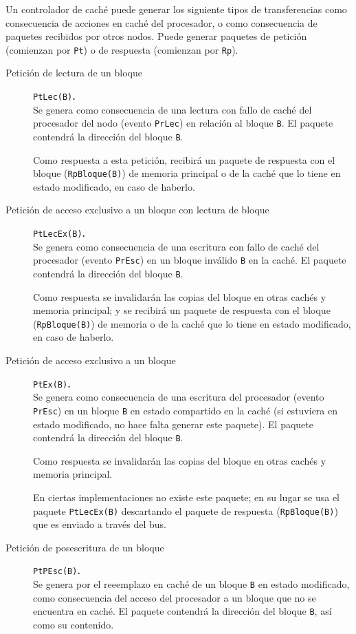 Un controlador de caché puede generar los siguiente tipos de transferencias como consecuencia de acciones en caché del procesador, o como consecuencia de paquetes recibidos por otros nodos. Puede generar paquetes de petición (comienzan por \verb|Pt|) o de respuesta (comienzan por \verb|Rp|).
\begin{description}
    \item [Petición de lectura de un bloque] \verb|PtLec(B)|\textbf{.}~\\
        Se genera como consecuencia de una lectura con fallo de caché del procesador del nodo (evento \verb|PrLec|) en relación al bloque \verb|B|. El paquete contendrá la dirección del bloque \verb|B|.

        Como respuesta a esta petición, recibirá un paquete de respuesta con el bloque (\verb|RpBloque(B)|) de memoria principal o de la caché que lo tiene en estado modificado, en caso de haberlo.
    \item [Petición de acceso exclusivo a un bloque con lectura de bloque] \verb|PtLecEx(B)|\textbf{.}~\\
        Se genera como consecuencia de una escritura con fallo de caché del procesador (evento \verb|PrEsc|) en un bloque inválido \verb|B| en la caché. El paquete contendrá la dirección del bloque \verb|B|.

        Como respuesta se invalidarán las copias del bloque en otras cachés y memoria principal; y se recibirá un paquete de respuesta con el bloque (\verb|RpBloque(B)|) de memoria o de la caché que lo tiene en estado modificado, en caso de haberlo.
    \item [Petición de acceso exclusivo a un bloque] \verb|PtEx(B)|\textbf{.}~\\
        Se genera como consecuencia de una escritura del procesador (evento \verb|PrEsc|) en un bloque \verb|B| en estado compartido en la caché (si estuviera en estado modificado, no hace falta generar este paquete). El paquete contendrá la dirección del bloque \verb|B|.

        Como respuesta se invalidarán las copias del bloque en otras cachés y memoria principal.

        En ciertas implementaciones no existe este paquete; en su lugar se usa el paquete \verb|PtLecEx(B)| descartando el paquete de respuesta (\verb|RpBloque(B)|) que es enviado a través del bus.
    \item [Petición de posescritura de un bloque] \verb|PtPEsc(B)|\textbf{.}~\\
        Se genera por el reeemplazo en caché de un bloque \verb|B| en estado modificado, como consecuencia del acceso del procesador a un bloque que no se encuentra en caché. El paquete contendrá la dirección del bloque \verb|B|, así como su contenido.


\end{description}
